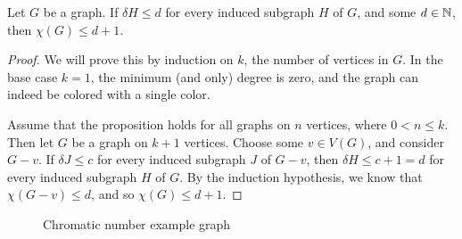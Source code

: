\begin{prop}\label{induced-subgraphs-minimum-degree}
    Let $G$ be a graph. If $\delta H \leq d$ for every induced subgraph $H$ of $G$, and some $d \in \mathbb{N}$, then $\chi(G) \leq d+1$.
\end{prop}

\begin{proof}
    We will prove this by induction on $k$, the number of vertices in $G$. In the base case $k=1$, the minimum (and only) degree is zero, and the graph can indeed be colored with a single color.

    Assume that the proposition holds for all graphs on $n$ vertices, where $0 < n \leq k$. Then let $G$ be a graph on $k+1$ vertices. Choose some $v \in V(G)$, and consider $G - v$. If $\delta J \leq c$ for every induced subgraph $J$ of $G - v$, then $\delta H \leq c +1 = d$ for every induced subgraph $H$ of $G$. By the induction hypothesis, we know that $\chi(G - v) \leq d$, and so $\chi(G) \leq d+1$.
\end{proof}

\begin{figure}[ht!]
    \centering
\caption{Chromatic number example graph}
\label{fig:chromatic-graph-example}
\end{figure}

